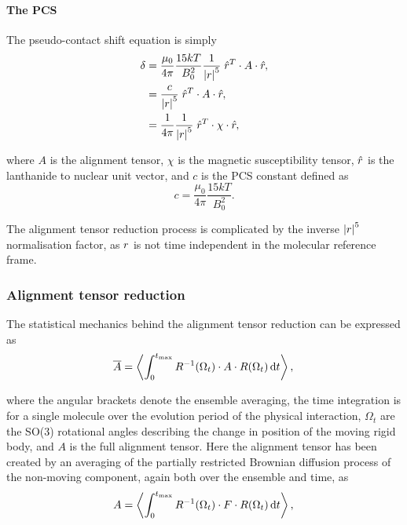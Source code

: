 \paragraph{The PCS}

The pseudo-contact shift equation is simply
\begin{subequations} \label{eq: PCS equation}
\begin{align}
    \delta &= \frac{\mu_0}{4\pi} \frac{15 k T}{B_0^2} \frac{1}{\left| r \right|^5} \; \hat{r}^T \cdot A \cdot \hat{r} , \\
           &= \frac{c}{\left| r \right|^5} \; \hat{r}^T \cdot A \cdot \hat{r} , \\
           &= \frac{1}{4\pi} \frac{1}{\left| r \right|^5} \; \hat{r}^T \cdot \chi \cdot \hat{r} ,
\end{align}
\end{subequations}

where $A$ is the alignment tensor, $\chi$ is the magnetic susceptibility tensor, $\hat{r}$ is the lanthanide to nuclear unit vector, and $c$ is the PCS constant defined as
\begin{equation} \label{eq: PCS constant}
    c = \frac{\mu_0}{4\pi} \frac{15 k T}{B_0^2} .
\end{equation}

The alignment tensor reduction process is complicated by the inverse $\left| r \right|^5$ normalisation factor, as $r$ is not time independent in the molecular reference frame.





\subsubsection{Alignment tensor reduction}

The statistical mechanics behind the alignment tensor reduction can be expressed as
\begin{equation}
    \overline A = \left\langle \int_0^{t_\textrm{max}} R^{-1}(\Omega_t) \cdot A \cdot R(\Omega_t) \,\mathrm{d} t \right\rangle , \\
\end{equation}

where the angular brackets denote the ensemble averaging, the time integration is for a single molecule over the evolution period of the physical interaction, $\Omega_t$ are the SO(3) rotational angles describing the change in position of the moving rigid body, and $A$ is the full alignment tensor.
Here the alignment tensor has been created by an averaging of the partially restricted Brownian diffusion process of the non-moving component, again both over the ensemble and time, as
\begin{equation}
    A = \left\langle \int_0^{t_\textrm{max}} R^{-1}(\Omega_t) \cdot F \cdot R(\Omega_t) \,\mathrm{d} t \right\rangle , \\
\end{equation}

